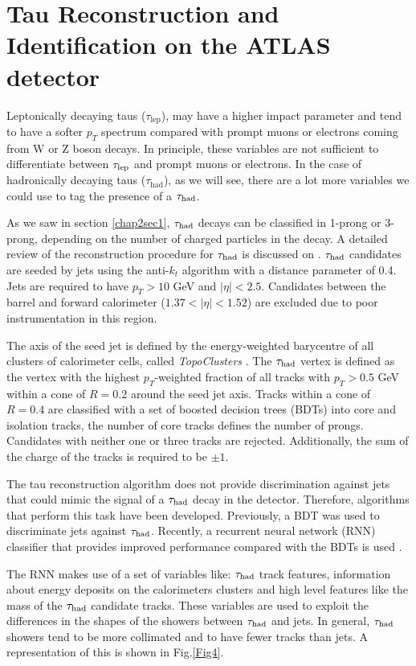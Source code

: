 \section{Tau Reconstruction and Identification on the ATLAS detector}
Leptonically decaying taus ($\tau_\text{lep}$), may have a higher impact parameter and tend to have a softer $p_T$ spectrum compared with prompt muons or electrons coming from W or Z boson decays. In principle, these variables are not sufficient to differentiate between $\tau_\text{lep}$ and prompt muons or electrons. In the case of hadronically decaying taus ($\tau_\text{had}$), as we will see, there are a lot more variables we could use to tag the presence of a $\tau_\text{had}$.

As we saw in section \ref{chap2sec1}, $\tau_\text{had}$ decays can be classified in 1-prong or 3-prong, depending on the number of charged particles in the decay. A detailed review of the reconstruction procedure for $\tau_\text{had}$ is discussed on \cite{Aad:2014rga}. $\tau_\text{had}$ candidates are seeded by jets using the anti-$k_t$ algorithm \cite{Cacciari:2008gp} with a distance parameter of 0.4. Jets are required to have $p_T>10$ GeV and $|\eta|<2.5$. Candidates between the barrel and forward calorimeter ($1.37<|\eta|<1.52$) are excluded due to poor instrumentation in this region.

The axis of the seed jet is defined by the energy-weighted barycentre of all clusters of calorimeter cells, called \textit{TopoClusters} \cite{Aad:2016upy}. The $\tau_\text{had}$ vertex is defined as the vertex with the highest $p_T$-weighted fraction of all tracks with $p_T>0.5$ GeV within a cone of $R=0.2$ around the seed jet axis. Tracks within a cone of $R=0.4$ are classified with a set of boosted decision trees (BDTs) into core and isolation tracks, the number of core tracks defines the number of prongs. Candidates with neither one or three tracks are rejected. Additionally, the sum of the charge of the tracks is required to be $\pm 1$.     

The tau reconstruction algorithm does not provide discrimination against jets that could mimic the signal of a $\tau_\text{had}$ decay in the detector. Therefore, algorithms that perform this task have been developed. Previously, a BDT was used to discriminate jets against $\tau_\text{had}$. Recently, a recurrent neural network (RNN) classifier that provides improved performance compared with the BDTs is used \cite{Deutsch:2680523}.

The RNN makes use of a set of variables like: $\tau_\text{had}$ track features, information about energy deposits on the calorimeters clusters and high level features like the mass of the $\tau_\text{had}$ candidate tracks. These variables are used to exploit the differences in the shapes of the showers between $\tau_\text{had}$ and jets. In general, $\tau_\text{had}$ showers tend to be more collimated and to have fewer tracks than jets. A representation of this is shown in Fig.\ref{Fig4}. 

